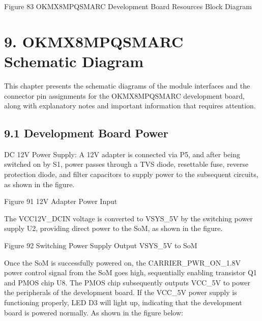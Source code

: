 \documentclass[letterpaper,10pt,openany,english]{sphinxmanual}
\begin{document}
\sphinxAtStartPar
Figure 8\sphinxhyphen{}3 OK\sphinxhyphen{}MX8MPQ\sphinxhyphen{}SMARC Development Board Resources Block Diagram


\chapter{9. OK\sphinxhyphen{}MX8MPQ\sphinxhyphen{}SMARC Schematic Diagram}
\label{\detokenize{hardware:ok-mx8mpq-smarc-schematic-diagram}}
\sphinxAtStartPar
This chapter presents the schematic diagrams of the module interfaces and the connector pin assignments for the OK\sphinxhyphen{}MX8MPQ\sphinxhyphen{}SMARC development board, along with explanatory notes and important information that requires attention.\\


\section{9.1 Development Board Power}
\label{\detokenize{hardware:development-board-power}}
\sphinxAtStartPar
DC 12V Power Supply: A 12V adapter is connected via P5, and after being switched on by S1, power passes through a TVS diode, resettable fuse, reverse protection diode, and filter capacitors to supply power to the subsequent circuits, as shown in the figure.

\sphinxAtStartPar
{}

\sphinxAtStartPar
Figure 9\sphinxhyphen{}1 12V Adapter Power Input

\sphinxAtStartPar
The VCC12V\_DCIN voltage is converted to VSYS\_5V by the switching power supply U2, providing direct power to the SoM, as shown in the figure.

\sphinxAtStartPar
{}

\sphinxAtStartPar
Figure 9\sphinxhyphen{}2 Switching Power Supply Output VSYS\_5V to SoM

\sphinxAtStartPar
Once the SoM is successfully powered on, the CARRIER\_PWR\_ON\_1.8V power control signal from the SoM goes high, sequentially enabling transistor Q1 and PMOS chip U8. The PMOS chip subsequently outputs VCC\_5V to power the peripherals of the development board. If the VCC\_5V power supply is functioning properly, LED D3 will light up, indicating that the development board is powered normally. As shown in the figure below:
\end{document}
